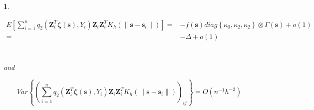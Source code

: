 \documentclass[12pt,english,authoryear, review]{article}\usepackage[]{graphicx}\usepackage[]{color}
\theoremstyle{plain}
\theoremstyle{plain}
\newtheorem{lem}{\protect\lemmaname}
\providecommand{\lemmaname}{Lemma}
\begin{document}
\begin{lem}
\label{lemma:delta}

\begin{align*}
E\left[\sum_{i=1}^{n}q_{2}\left(\bm{Z}_{i}^{T}\bm{\zeta}\left(\bm{s}\right),Y_{i}\right)\bm{Z}_{i}\bm{Z}_{i}^{T}K_{h}\left(\|\bm{s}-\bm{s}_{i}\|\right)\right]= & -f\left(\bm{s}\right)diag\left\{ \kappa_{0},\kappa_{2},\kappa_{2}\right\} \otimes\Gamma\left(\bm{s}\right)+o\left(1\right)\\
= & -\Delta+o\left(1\right)
\end{align*}


\begin{multline*}
\\
\end{multline*}


and

\[
Var\left\{ \left(\sum_{i=1}^{n}q_{2}\left(\bm{Z}_{i}^{T}\bm{\zeta}\left(\bm{s}\right),Y_{i}\right)\bm{Z}_{i}\bm{Z}_{i}^{T}K_{h}\left(\|\bm{s}-\bm{s}_{i}\|\right)\right)_{ij}\right\} =O\left(n^{-1}h^{-2}\right)
\]

\end{lem}
\end{document}
